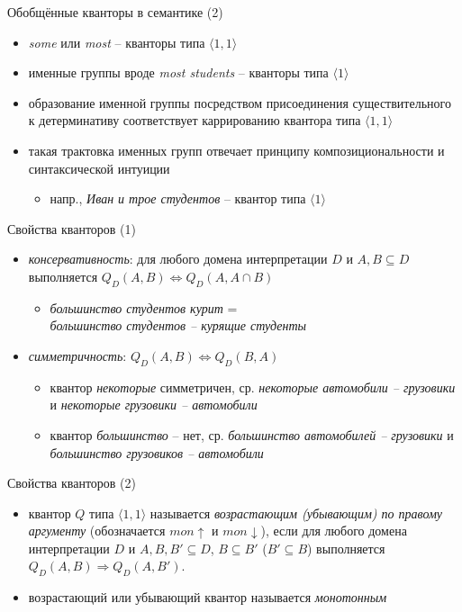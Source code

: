 \documentclass{beamer}
\begin{document}
\begin{frame}{Обобщённые кванторы в семантике (2)}
\begin{itemize}
	\item \textit{some} или \textit{most} -- кванторы типа $\langle 1, 1 \rangle$
	\medskip
	\item именные группы вроде \textit{most students} -- кванторы типа $\langle 1 \rangle$
	\medskip
	\item образование именной группы посредством присоединения существительного к детерминативу соответствует каррированию квантора типа $\langle 1, 1 \rangle$
	\medskip
	\item такая трактовка именных групп отвечает принципу композициональности и синтаксической интуиции
	\medskip
	\begin{itemize}
	    \item напр., \textit{Иван и трое студентов} -- квантор типа $\langle 1 \rangle$
    \end{itemize}
\end{itemize}
\end{frame}

\begin{frame}{Свойства кванторов (1)}
\begin{itemize}
	\item \textit{консервативность}: для любого домена интерпретации $D$ и $A, B \subseteq D$ выполняется $Q_D(A, B) \Leftrightarrow Q_D(A, A \cap B)$
	\medskip
	\begin{itemize}
	    \item \textit{большинство студентов курит} =\\ \textit{большинство студентов -- курящие студенты}
    \end{itemize}
    \bigskip
	\item \textit{симметричность}: $Q_D(A, B) \Leftrightarrow Q_D(B, A)$
	\medskip
	\begin{itemize}
	    \item квантор \textit{некоторые} симметричен, ср. \textit{некоторые автомобили -- грузовики} и \textit{некоторые грузовики -- автомобили}
	    \medskip
	    \item квантор \textit{большинство} -- нет, ср. \textit{большинство автомобилей -- грузовики} и \textit{большинство грузовиков -- автомобили}
    \end{itemize}	
	\end{itemize}
\end{frame}

\begin{frame}{Свойства кванторов (2)}
\begin{itemize}
	\item квантор $Q$ типа $\langle 1, 1 \rangle$ называется \textit{возрастающим (убывающим) по правому аргументу} (обозначается $mon \! \uparrow$ и $mon \! \downarrow$), если для любого домена интерпретации $D$ и $A, B, B' \subseteq D$, $B \subseteq B'$ ($B' \subseteq B$) выполняется $Q_D(A, B) \Rightarrow Q_D(A, B')$. 
	\medskip
	\item возрастающий или убывающий квантор называется \textit{монотонным}
\end{itemize}
\end{frame}
\end{document}
